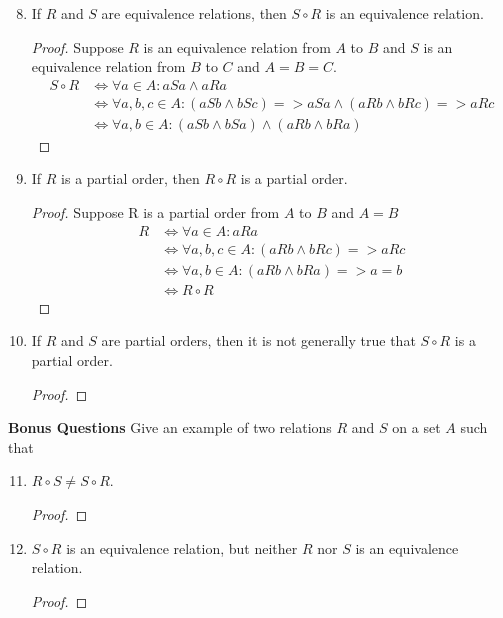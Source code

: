 \documentclass{article}
\begin{document}
  \begin{enumerate} \setcounter{enumi}{7}
    \item If $R$ and $S$ are equivalence relations, then $S \circ R$ is an equivalence relation.
      \begin{proof}
        Suppose $R$ is an equivalence relation from $A$ to $B$ and $S$ is an equivalence relation from $B$ to $C$ and $A = B = C$.
        \begin{align*}
          S \circ R &\iff \forall a\in A : aSa \wedge aRa \\
          &\iff \forall a,b,c\in A: (aSb \wedge bSc) => aSa \wedge (aRb \wedge bRc) => aRc \\
            &\iff \forall a,b\in A: (aSb \wedge bSa) \wedge (aRb \wedge bRa) 
        \end{align*}
      \end{proof}
    \item If $R$ is a partial order, then $R \circ R$ is a partial order.
      \begin{proof}
        Suppose R is a partial order from $A$ to $B$ and $A = B$
        \begin{align*}
          R &\iff \forall a\in A: aRa \\
            &\iff \forall a,b, c\in A: (aRb \wedge bRc) => aRc \\
            &\iff \forall a,b\in A: (aRb \wedge bRa) => a = b \\
              &\iff R \circ R
        \end{align*}
      \end{proof}
    \item If $R$ and $S$ are partial orders, then it is not generally true that $S \circ R$ is a partial order.
      \begin{proof}
        
      \end{proof}
  \end{enumerate}
  \textbf{Bonus Questions}
  Give an example of two relations $R$ and $S$ on a set $A$ such that \\
  \begin{enumerate} \setcounter{enumi}{10}
    \item $R \circ S \neq S \circ R$.
      \begin{proof}
        
      \end{proof}
    \item $S \circ R$ is an equivalence relation, but neither $R$ nor $S$ is an equivalence relation.
      \begin{proof}
        
      \end{proof}
   \end{enumerate}
\end{document}
